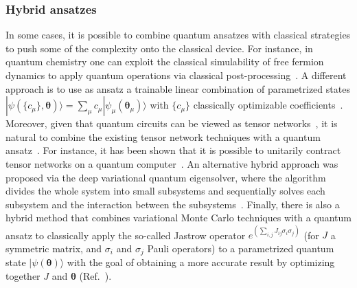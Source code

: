 \documentclass[prx,twocolumn,floatfix,superscriptaddress,longbibliography]{revtex4-1}
\renewcommand{\vec}[1]{\boldsymbol{#1}}  %
\newcommand{\<}{\langle}
\renewcommand{\>}{\rangle}
\newcommand{\ket}[1]{|#1\rangle}               %
\renewcommand{\vec}[1]{\boldsymbol{#1}}  %
\begin{document}
\subsubsection{ Hybrid ansatzes} In some cases, it is possible to combine quantum ansatzes with classical strategies to push some of the complexity onto the classical device.  For instance, in quantum chemistry one can exploit the classical simulability of free fermion dynamics to apply quantum operations via classical post-processing~\cite{PhysRevX.10.011004,Valiant2002quantum, Terhal2002classical, Jozsa2008matchgates,Mizukami2020orbital,Sokolov2020quantum}. A different approach is to use as ansatz a trainable linear combination of parametrized states $\ket{\psi(\{c_\mu\},\vec{\theta})} = \sum_\mu c_\mu \ket{\psi_\mu(\bm{\theta}_\mu)}$ with $\{c_\mu\}$ classically optimizable coefficients~\cite{mcclean2017hybrid, parrish2019quantum, parrish2019quantumfilter, Huggins2020nonorthogonal, stair2019multireference, bharti2020iterative,bharti2020quantum}. Moreover, given that quantum circuits can be viewed as tensor networks~\cite{Markov2008simulating}, it is natural to combine the existing tensor network techniques with a quantum ansatz~\cite{kim2017robust,kim2017holographic,Liu2019variational,barratt2020parallel,yuan2020quantum}. For instance, it has been shown that it is possible to unitarily contract tensor networks on a quantum computer~\cite{kim2017robust,kim2017holographic}. An alternative hybrid approach was proposed via the deep variational quantum eigensolver, where the algorithm divides the whole system into small subsystems and sequentially solves each subsystem and the interaction between the subsystems~\cite{fujii2020deep}. Finally, there is also a hybrid method that combines variational Monte Carlo techniques with a quantum ansatz to classically apply the so-called Jastrow operator $e^{\left(\sum_{i,j}J_{ij}\sigma_i \sigma_j\right)}$ (for $J$ a symmetric matrix, and $\sigma_i$ and $\sigma_j$ Pauli operators) to a parametrized quantum state $\ket{\psi(\vec{\theta})}$ with the goal of obtaining a more accurate result by optimizing together $J$ and $\vec{\theta}$ (Ref.~\cite{Mazzola2019nonunitary}).
\end{document}
